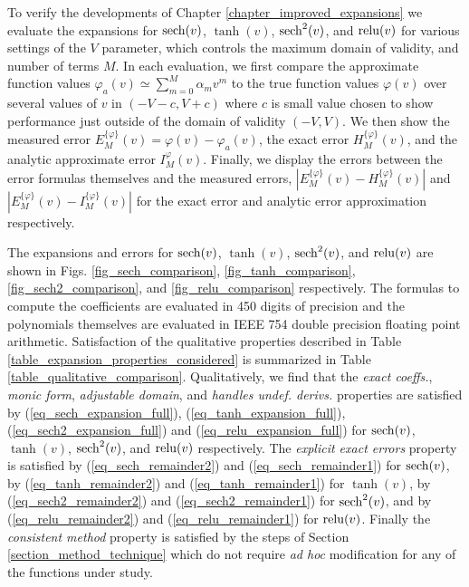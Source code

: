 To verify the developments of Chapter \ref{chapter_improved_expansions}
we evaluate the expansions for $\operatorname{sech}(v)$, $\tanh(v)$, $\operatorname{sech}^2(v)$, and $\operatorname{relu}(v)$ for various
settings of the $V$ parameter, which controls the maximum
domain of validity, and number of terms $M$.  In each evaluation,
we first compare the approximate function values
$\varphi_a(v) \simeq \sum_{m=0}^M\alpha_m v^m$ to the true
function values $\varphi(v)$ over several values of $v$ in $(-V - c, V + c)$
where $c$ is small value chosen to show performance just outside
of the domain of validity $(-V, V)$.  We then show the
measured error
$E_M^{\{\varphi\}}(v) = \varphi(v) - \varphi_a(v)$,
the exact error $H_M^{\{\varphi\}}(v)$, and the analytic
approximate error $I_M^{\varphi}(v)$.  Finally, we display
the errors between the error formulas themselves and
the measured errors,
$\left|E_M^{\{\varphi\}}(v) - H_M^{\{\varphi\}}(v)\right|$ and
$\left|E_M^{\{\varphi\}}(v) - I_M^{\{\varphi\}}(v)\right|$ for
the exact error and analytic error approximation respectively.

The expansions and errors for $\operatorname{sech}(v)$, $\tanh(v)$, $\operatorname{sech}^2(v)$, and $\operatorname{relu}(v)$ are
shown in Figs. \ref{fig_sech_comparison}, \ref{fig_tanh_comparison},
\ref{fig_sech2_comparison}, and \ref{fig_relu_comparison} respectively. 
The formulas to compute the coefficients are evaluated in 450 digits of
precision and the polynomials themselves are evaluated
in IEEE 754 double precision floating point arithmetic.
Satisfaction of the qualitative properties described
in Table \ref{table_expansion_properties_considered}
is summarized in Table \ref{table_qualitative_comparison}.
Qualitatively, we find that the \textit{exact coeffs.},
\textit{monic form}, \textit{adjustable domain}, and
\textit{handles undef. derivs.} properties are satisfied
by (\ref{eq_sech_expansion_full}), (\ref{eq_tanh_expansion_full}),
(\ref{eq_sech2_expansion_full}) and (\ref{eq_relu_expansion_full}) for
$\operatorname{sech}(v)$, $\tanh(v)$, $\operatorname{sech}^2(v)$, and $\operatorname{relu}(v)$ respectively.
The \textit{explicit exact errors}
property is satisfied
by (\ref{eq_sech_remainder2}) and (\ref{eq_sech_remainder1}) for $\operatorname{sech}(v)$,
by (\ref{eq_tanh_remainder2}) and (\ref{eq_tanh_remainder1}) for $\tanh(v)$,
by (\ref{eq_sech2_remainder2}) and (\ref{eq_sech2_remainder1}) for $\operatorname{sech}^2(v)$,
and by (\ref{eq_relu_remainder2}) and (\ref{eq_relu_remainder1}) for $\operatorname{relu}(v)$.
Finally the \textit{consistent method} property is
satisfied by the steps of Section \ref{section_method_technique} which do not
require \textit{ad hoc} modification for any of the functions under study.

